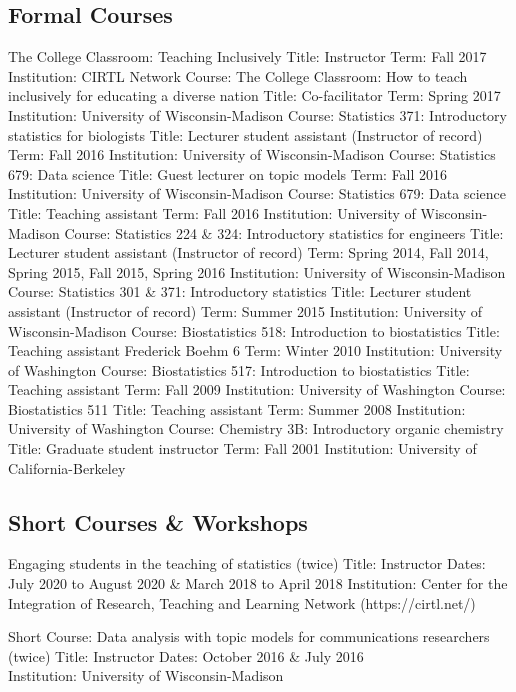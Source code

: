 \documentclass[
  11pt,
  letterpaper,
  DIV=11,
  numbers=noendperiod]{scrartcl}
\begin{document}
\hypertarget{formal-courses}{%
\subsection{Formal Courses}\label{formal-courses}}

The College Classroom: Teaching Inclusively Title: Instructor Term: Fall
2017 Institution: CIRTL Network Course: The College Classroom: How to
teach inclusively for educating a diverse nation Title: Co-facilitator
Term: Spring 2017 Institution: University of Wisconsin-Madison Course:
Statistics 371: Introductory statistics for biologists Title: Lecturer
student assistant (Instructor of record) Term: Fall 2016 Institution:
University of Wisconsin-Madison Course: Statistics 679: Data science
Title: Guest lecturer on topic models Term: Fall 2016 Institution:
University of Wisconsin-Madison Course: Statistics 679: Data science
Title: Teaching assistant Term: Fall 2016 Institution: University of
Wisconsin-Madison Course: Statistics 224 \& 324: Introductory statistics
for engineers Title: Lecturer student assistant (Instructor of record)
Term: Spring 2014, Fall 2014, Spring 2015, Fall 2015, Spring 2016
Institution: University of Wisconsin-Madison Course: Statistics 301 \&
371: Introductory statistics Title: Lecturer student assistant
(Instructor of record) Term: Summer 2015 Institution: University of
Wisconsin-Madison Course: Biostatistics 518: Introduction to
biostatistics Title: Teaching assistant Frederick Boehm 6 Term: Winter
2010 Institution: University of Washington Course: Biostatistics 517:
Introduction to biostatistics Title: Teaching assistant Term: Fall 2009
Institution: University of Washington Course: Biostatistics 511 Title:
Teaching assistant Term: Summer 2008 Institution: University of
Washington Course: Chemistry 3B: Introductory organic chemistry Title:
Graduate student instructor Term: Fall 2001 Institution: University of
California-Berkeley

\hypertarget{short-courses-workshops}{%
\subsection{Short Courses \& Workshops}\label{short-courses-workshops}}

Engaging students in the teaching of statistics (twice) Title:
Instructor Dates: July 2020 to August 2020 \& March 2018 to April 2018
Institution: Center for the Integration of Research, Teaching and
Learning Network (https://cirtl.net/)

Short Course: Data analysis with topic models for communications
researchers (twice) Title: Instructor Dates: October 2016 \& July 2016\\
Institution: University of Wisconsin-Madison
\end{document}
